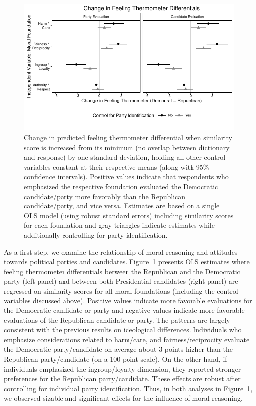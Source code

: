 \documentclass[12pt]{article}
\begin{document}
\begin{figure}[ht]\centering
\includegraphics{../calc/fig/ols_feel.pdf}
\caption{Change in predicted feeling thermometer differential when similarity score is increased from its minimum (no overlap between dictionary and response) by one standard deviation, holding all other control variables constant at their respective means (along with 95\% confidence intervals). Positive values indicate that respondents who emphasized the respective foundation evaluated the Democratic candidate/party more favorably than the Republican candidate/party, and vice versa. Estimates are based on a single OLS model (using robust standard errors) including similarity scores for each foundation and gray triangles indicate estimates while additionally controlling for party identification. %
}\label{fig:ols_feel}
\end{figure}

As a first step, we examine the relationship of moral reasoning and attitudes towards political parties and candidates. Figure~\ref{fig:ols_feel} presents OLS estimates where feeling thermometer differentials between the Republican and the Democratic party (left panel) and between both Presidential candidates (right panel) are regressed on similarity scores for all moral foundations (including the control variables discussed above). Positive values indicate more favorable evaluations for the Democratic candidate or party and negative values indicate more favorable evaluations of the Republican candidate or party. The patterns are largely consistent with the previous results on ideological differences. Individuals who emphasize considerations related to harm/care, and fairness/reciprocity evaluate the Democratic party/candidate on average about 3 points higher than the Republican party/candidate (on a 100 point scale). On the other hand, if individuals emphasized the ingroup/loyalty dimension, they reported stronger preferences for the Republican party/candidate. These effects are robust after controlling for individual party identification. Thus, in both analyses in Figure~\ref{fig:ols_feel}, we observed sizable and significant effects for the influence of moral reasoning.
\end{document}
